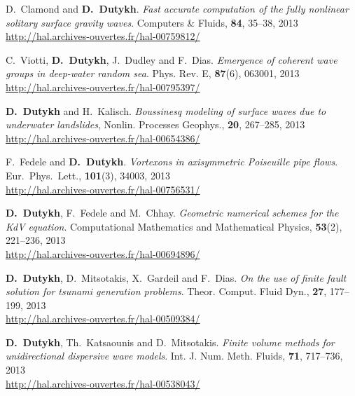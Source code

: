 \begin{etaremune}
  \item D.~Clamond and \textbf{D.~Dutykh}. \textit{Fast accurate computation of the fully nonlinear solitary surface gravity waves}. Computers \& Fluids, \textbf{84}, 35--38, 2013 \\ %
  \url{http://hal.archives-ouvertes.fr/hal-00759812/}
  
  \item C.~Viotti, \textbf{D.~Dutykh}, J.~Dudley and F.~Dias. \textit{Emergence of coherent wave groups in deep-water random sea}. Phys. Rev. E, \textbf{87}(6), 063001, 2013 \\ %
  \url{http://hal.archives-ouvertes.fr/hal-00795397/}
  
  \item \textbf{D.~Dutykh} and H.~Kalisch. \textit{Boussinesq modeling of surface waves due to underwater landslides}, Nonlin. Processes Geophys., \textbf{20}, 267--285, 2013 \\ %
  \url{http://hal.archives-ouvertes.fr/hal-00654386/}

  \item F.~Fedele and \textbf{D.~Dutykh}. \textit{Vortexons in axisymmetric Poiseuille pipe flows}. Eur.~Phys.~Lett., \textbf{101}(3), 34003, 2013 \\ %
  \url{http://hal.archives-ouvertes.fr/hal-00756531/}
  
  \item \textbf{D.~Dutykh}, F.~Fedele and M.~Chhay. \textit{Geometric numerical schemes for the KdV equation}. Computational Mathematics and Mathematical Physics, \textbf{53}(2), 221--236, 2013 \\ %
  \url{http://hal.archives-ouvertes.fr/hal-00694896/}
  
  \item \textbf{D.~Dutykh}, D.~Mitsotakis, X.~Gardeil and F.~Dias. \textit{On the use of finite fault solution for tsunami generation problems}. Theor. Comput. Fluid Dyn., \textbf{27}, 177--199, 2013 \\ %
  \url{http://hal.archives-ouvertes.fr/hal-00509384/}

  \item \textbf{D.~Dutykh}, Th.~Katsaounis and D.~Mitsotakis. \textit{Finite volume methods for unidirectional dispersive wave models}. Int. J. Num. Meth. Fluids, \textbf{71}, 717--736, 2013 \\ %
  \url{http://hal.archives-ouvertes.fr/hal-00538043/}
  

\end{etaremune}
